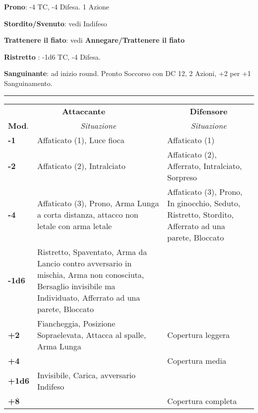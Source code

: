 \documentclass[a4paper,12 pt,openany]{book}
\newcommand{\riga}{\rule{\textwidth}{0.4pt}}
\begin{document}
\begin{textblock*}{19 cm}
\begin{multicols}{2}
\textbf{Prono}: -4 TC, -4 Difesa. 1 Azione

\textbf{Stordito/Svenuto}: vedi Indifeso

\textbf{Trattenere il fiato}: vedi \textbf{Annegare/Trattenere il fiato}

\textbf{Ristretto} : -1d6 TC, -4 Difesa.

\textbf{Sanguinante}: ad inizio round. Pronto Soccorso con DC 12, 2 Azioni, +2 per +1 Sanguinamento.

\end{multicols}

\riga


\noindent\begin{tabularx}{0.98\textwidth}{l|X|X}
	\multicolumn{2}{c}{\textbf{Attaccante}}&\multicolumn{1}{c}{\textbf{Difensore}}\\
	\textbf{Mod}.&\multicolumn{1}{c}{\emph{Situazione}}&\multicolumn{1}{c}{\emph{Situazione}}\\
	\textbf{-1}& Affaticato (1), Luce fioca&Affaticato (1)\\
	\hline
	\textbf{-2}& Affaticato (2), Intralciato & Affaticato (2), Afferrato, Intralciato, Sorpreso\\
	\hline
	\textbf{-4}& Affaticato (3), Prono, Arma Lunga a corta distanza, attacco non letale con arma letale& Affaticato (3), Prono, In ginocchio, Seduto, Ristretto, Stordito, Afferrato ad una parete, Bloccato\\
	\hline
	\textbf{-1d6}& Ristretto, Spaventato, Arma da Lancio contro avversario in mischia, Arma non conosciuta, Bersaglio invisibile ma Individuato, Afferrato ad una parete, Bloccato&\\
	\hline
	\textbf{+2}& Fiancheggia, Posizione Sopraelevata, Attacca al spalle, Arma Lunga& Copertura leggera\\
	\hline
	\textbf{+4}&& Copertura media\\
	\hline
	\textbf{+1d6}& Invisibile, Carica, avversario Indifeso& \\
	\hline
	\textbf{+8}&& Copertura completa
\end{tabularx}



\end{textblock*}

~\newpage
\end{document}
